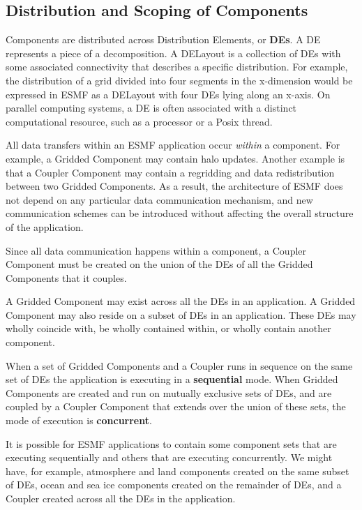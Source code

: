 \subsection{Distribution and Scoping of Components}
\label{sec:scoping}

Components are distributed across Distribution Elements, or {\bf DEs}.
A DE represents a piece of a decomposition.  A DELayout is a collection
of DEs with some associated connectivity that describes a specific 
distribution.  For example, the distribution of a grid divided 
into four segments in the x-dimension would be expressed in ESMF as
a DELayout with four DEs lying along an x-axis. On parallel computing
systems, a DE is often associated with a distinct computational resource, 
such as a processor or a Posix thread.  

All data transfers within an ESMF application occur {\it within} a 
component.  For example, a Gridded Component may contain halo updates.
Another example is that a Coupler Component may contain a regridding 
and data redistribution between two Gridded Components.  As a result, 
the architecture of ESMF does not depend on any particular data 
communication mechanism, and new communication schemes can be 
introduced without affecting the overall structure of the application.

Since all data communication happens within a component, a Coupler 
Component must be created on the union of the DEs of all
the Gridded Components that it couples.  

A Gridded Component may exist across all the DEs in an application.  
A Gridded Component may also reside on a subset of DEs in an 
application.  These DEs may wholly coincide with, be wholly contained 
within, or wholly contain another component.  

When a set of Gridded  Components and a Coupler runs in sequence 
on the same set of DEs the application is executing in a {\bf sequential} 
mode. When Gridded Components are created and run on mutually exclusive
sets of DEs, and are coupled by a Coupler Component that extends over
the union of these sets, the mode of execution is {\bf concurrent}.

It is possible for ESMF applications to contain some component sets
that are executing sequentially and others that are executing concurrently.
We might have, for example, atmosphere and land components created 
on the same subset of DEs, ocean and sea ice components created on 
the remainder of DEs, and a Coupler created across all the DEs in
the application.

